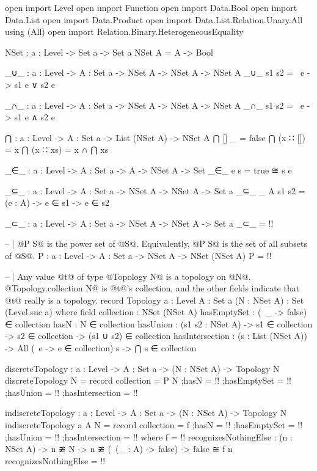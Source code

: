 \begin{code}
open import Level
open import Function
open import Data.Bool
open import Data.List
open import Data.Product
open import Data.List.Relation.Unary.All using (All)
open import Relation.Binary.HeterogeneousEquality

NSet : {a : Level} -> Set a -> Set a
NSet A = A -> Bool

_∪_ : {a : Level} -> {A : Set a} -> NSet A -> NSet A -> NSet A
_∪_ s1 s2 = \ e -> s1 e ∨ s2 e

_∩_ : {a : Level} -> {A : Set a} -> NSet A -> NSet A -> NSet A
_∩_ s1 s2 = \ e -> s1 e ∧ s2 e

⋂ : {a : Level} -> {A : Set a} -> List (NSet A) -> NSet A
⋂ [] _ = false
⋂ (x ∷ []) = x
⋂ (x ∷ xs) = x ∩ ⋂ xs

_∈_ : {a : Level} -> {A : Set a} -> A -> NSet A -> Set
_∈_ e s = true ≅ s e

_⊆_ : {a : Level} -> {A : Set a} -> NSet A -> NSet A -> Set a
_⊆_ {_} {A} s1 s2 = (e : A) -> e ∈ s1 -> e ∈ s2

_⊂_ : {a : Level} -> {A : Set a} -> NSet A -> NSet A -> Set a
_⊂_ = {!!}

-- | @P S@ is the power set of @S@.  Equivalently, @P S@ is the set of all subsets of @S@.
P : {a : Level} -> {A : Set a} -> NSet A -> NSet (NSet A)
P = {!!}

-- | Any value @t@ of type @Topology N@ is a topology on @N@.  @Topology.collection N@ is @t@'s collection, and the other fields indicate that @t@ really is a topology.
record Topology {a : Level}
                {A : Set a}
                (N : NSet A) : Set (Level.suc a) where
  field
    collection : NSet (NSet A)
    hasEmptySet : (\ _ -> false) ∈ collection
    hasN : N ∈ collection
    hasUnion : (s1 s2 : NSet A) ->
               s1 ∈ collection ->
               s2 ∈ collection ->
               (s1 ∪ s2) ∈ collection
    hasIntersection : (s : List (NSet A)) ->
                      All (\ e -> e ∈ collection) s ->
                      ⋂ s ∈ collection

discreteTopology : {a : Level} -> {A : Set a} -> (N : NSet A) -> Topology N
discreteTopology N = record
  {collection = P N
  ;hasN = {!!}
  ;hasEmptySet = {!!}
  ;hasUnion = {!!}
  ;hasIntersection = {!!}
  }

indiscreteTopology : {a : Level} -> {A : Set a} -> (N : NSet A) -> Topology N
indiscreteTopology {a} {A} N = record
  {collection = f
  ;hasN = {!!}
  ;hasEmptySet = {!!}
  ;hasUnion = {!!}
  ;hasIntersection = {!!}
  }
  where
  f = {!!}
  recognizesNothingElse :
    (n : NSet A) ->
    n ≇ N ->
    n ≇ (\ (_ : A) -> false) ->
    false ≅ f n
  recognizesNothingElse = {!!}
  

\end{code}
